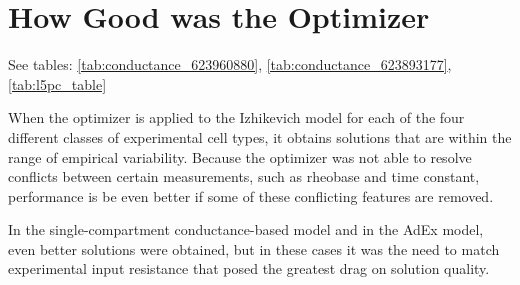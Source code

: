 \section{How Good was the Optimizer}

See tables: \ref{tab:conductance_623960880}, \ref{tab:conductance_623893177}, \ref{tab:l5pc_table}



When the optimizer is applied to the Izhikevich model for each of the four different classes of experimental cell types, it obtains solutions that are within the range of empirical variability.
Because the optimizer was not able to resolve conflicts between certain measurements, such as rheobase and time constant, performance is be even better if some of these conflicting features are removed.

In the single-compartment conductance-based model and in the AdEx model, even better solutions were obtained, but in these cases it was the need to match experimental input resistance that posed the greatest drag on solution quality.










